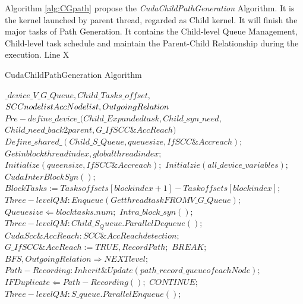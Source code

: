 \documentclass{llncs}
\begin{document}
Algorithm \ref{alg:CGpath} propose the \textsl{CudaChildPathGeneration} Algorithm. It is the kernel launched by parent thread, regarded as Child kernel. It will finish the major tasks of Path Generation. It contains the Child-level Queue Management, Child-level task schedule and maintain the Parent-Child Relationship during the execution. Line X

            \begin{algorithm}[htbp]
            \caption{CudaChildPathGeneration Algorithm}
            \label{alg:CGpath}
            \begin{algorithmic}[1]
            \Require
            $\_device\_ V\_G\_Queue, Child\_Tasks\_offset, $ \\
            $SCCnodelist\/AccNodelist, OutgoingRelation$ \\
            $Pre-define \_device\_ (Child\_Expandedtask, Child\_syn\_need,$\\
            $Child\_need\_back2parent,G\_IfSCC\&AccReach)$
            \State $Define \_shared\_ (Child\_S\_Queue, queuesize, IfSCC\&Accreach);$
            \State $Get inblockthreadindex, globalthreadindex;$
                \State $Initialize(queensize, IfSCC\&Accreach);$
            \EndIf
                \State $Initialzie(all \_device\_ variables);$
            \EndIf
            \State $CudaInterBlockSyn();$
	            \State $BlockTasks := Tasksoffsets[blockindex + 1] - Taskoffsets[blockindex];$
	            \State $Three-levelQM: Enqueue(Getthreadtask FROM V\_G\_Queue);$
                \State $Queuesize \Leftarrow blocktasks.num;$
                \State $Intra\_block\_syn();$
		             \State $Three-levelQM:Child\_S_Queue.ParallelDequeue();$
		             \State $CudaScc\&AccReach: SCC\&AccReach detection;$
                                \State $G\_IfSCC\&AccReach := TRUE, Record Path;$
                                \State $BREAK;$
                            \EndIf
		             \State $BFS{}, OutgoingRelation \Rightarrow NEXT level;$
		             \State $Path-Recording:Inherit\&Update(path\_record\_queue of each Node);$
                     \State $IFDuplicate \Leftarrow Path-Recording();$
                                \State $CONTINUE;$
		             \State $Three-levelQM:S\_queue.ParallelEnqueue();$

\end{algorithmic}
\end{algorithm}
\end{document}
